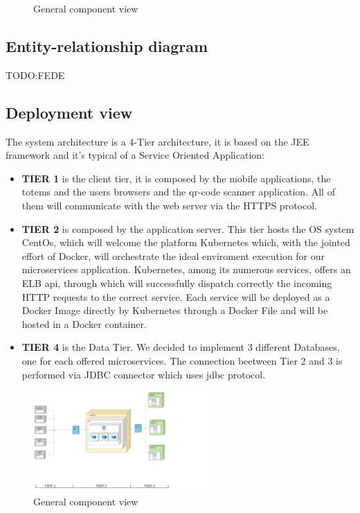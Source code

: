 \begin{figure}[h!]
    \centering
    \caption{\label{fig:ComponentViewAccountManagerServices}{General component view}}
\end{figure}




\subsection{Entity-relationship diagram}
\label{subsect:entityrelationshipdiagram}

TODO:FEDE

\subsection{Deployment view}
\label{subsect:deploymentview}
The system architecture is a 4-Tier architecture, it is based on the JEE framework and it's typical of a Service Oriented Application:
\begin{itemize}
    \item \textbf{TIER 1} is the client tier, it is composed by the mobile applications, the totems and the users browsers and the qr-code scanner application. All of them will communicate with the web server via the HTTPS protocol.
    \item \textbf{TIER 2} is composed by the application server. This tier hosts the OS system CentOs, which will welcome the platform Kubernetes which, with the jointed effort of Docker, will orchestrate the ideal enviroment execution for our microservices application. Kubernetes, among its numerous services, offers an ELB api, through which will successfully dispatch correctly the incoming HTTP requests to the correct service. Each service will be deployed as a Docker Image directly by Kubernetes through a Docker File and will be hosted in a Docker container.
    \item \textbf{TIER 4} is the Data Tier. 
    We decided to implement 3 different Databases, one for each offered microservices. 
    The connection beetween Tier 2 and 3 is performed via JDBC connector which uses jdbc protocol.
\end{itemize}
\begin{figure}[h!]
    \centering
    \includegraphics[width=0.6\textwidth]{Images/Deployement View (2).png}
    \caption{\label{fig:Deployement View}{General component view}}
\end{figure}

